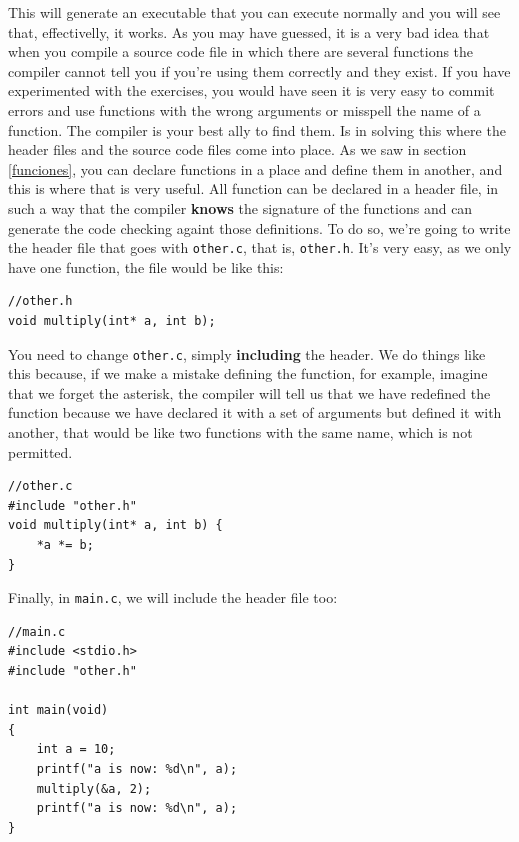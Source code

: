 \documentclass[a4paper]{article}
\begin{document}
This will generate an executable that you can execute normally and you will see
that, effectivelly, it works. As you may have guessed, it is a very bad idea
that when you compile a source code file in which there are several functions
the compiler cannot tell you if you're using them correctly and they exist.
If you have experimented with the exercises, you would have seen it is very easy
to commit errors and use functions with the wrong arguments or misspell the name
of a function. The compiler is your best ally to find them. Is in solving this
where the header files and the source code files come into place. As we saw in
section \ref{funciones}, you can declare functions in a place and define them in
another, and this is where that is very useful. All function can be declared in
a header file, in such a way that the compiler \textbf{knows} the signature of
the functions and can generate the code checking againt those definitions.
To do so, we're going to write the header file that goes with \verb!other.c!,
that is, \verb!other.h!. It's very easy, as we only have one function, the file
would be like this:

\noindent
\begin{minipage}[H]{\linewidth}
\mbox{}
\begin{lstlisting}[style=C,
caption={Header file},
label={lst:headerFile}]
//other.h
void multiply(int* a, int b);
\end{lstlisting}
\end{minipage}

You need to change \verb!other.c!, simply \textbf{including} the header. We do
things like this because, if we make a mistake defining the function, for
example, imagine that we forget the asterisk, the compiler will tell us that
we have redefined the function because we have declared it with a set of
arguments but defined it with another, that would be like two functions with
the same name, which is not permitted.

\noindent
\begin{minipage}[H]{\linewidth}
\mbox{}
\begin{lstlisting}[style=C,
caption={Definition file with included header},
label={lst:fileCofHeader}]
//other.c
#include "other.h"
void multiply(int* a, int b) {
    *a *= b;
}
\end{lstlisting}
\end{minipage}

Finally, in \verb!main.c!, we will include the header file too:

\noindent
\begin{minipage}[H]{\linewidth}
\mbox{}
\begin{lstlisting}[style=C,
caption={Main file with included headers},
label={lst:fileCofHeader}]
//main.c
#include <stdio.h>
#include "other.h"

int main(void)
{
    int a = 10;
    printf("a is now: %d\n", a);
    multiply(&a, 2);
    printf("a is now: %d\n", a);
}
\end{lstlisting}
\end{minipage}
\end{document}
